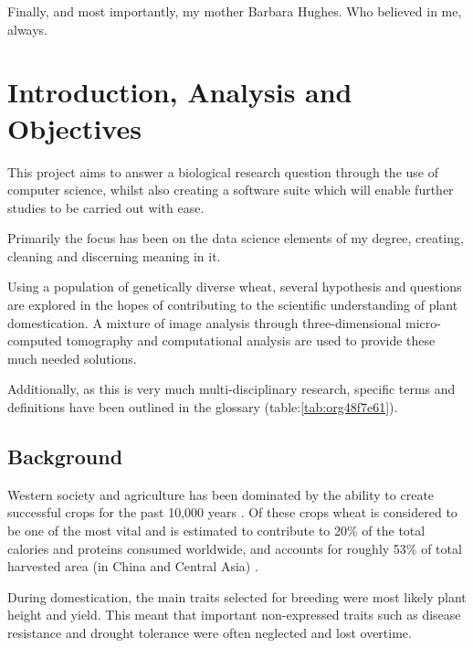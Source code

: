 \documentclass[11pt]{report}
\begin{document}
\vspace{1cm}

Finally, and most importantly, my mother Barbara Hughes. Who believed in me, always.



  \clearpage
  \tableofcontents
  \clearpage
  \listoftables
  \clearpage
  \listoffigures
  \clearpage
  \listofmyequations
  \clearpage
  \listoflistings
  \clearpage

\chapter{Introduction, Analysis and Objectives}
\label{sec:org4b0a4eb}

This project aims to answer a biological research question through the use of computer science, whilst also creating a software suite which will enable further studies to be carried out with ease.

Primarily the focus has been on the data science elements of my degree, creating, cleaning and discerning meaning in it.

Using a population of genetically diverse wheat, several hypothesis and questions are explored in the hopes of contributing to the scientific understanding of plant domestication. A mixture of image analysis through three-dimensional micro-computed tomography and computational analysis are used to provide these much needed solutions.


Additionally, as this is very much multi-disciplinary research, specific terms and definitions have been outlined in the glossary (table:\ref{tab:org48f7e61}).

\section{Background}
\label{sec:org7f2ed58}

Western society and agriculture has been dominated by the ability to create successful crops for the past 10,000 years \cite{Ozkan2002}. Of these crops wheat is considered to be one of the most vital and is estimated to contribute to 20\% of the total calories and proteins consumed worldwide, and accounts for roughly 53\% of total harvested area (in China and Central Asia) \cite{Shiferaw2013}.

During domestication, the main traits selected for breeding were most likely plant height and yield. This meant that important non-expressed traits such as disease resistance and drought tolerance were often neglected and lost overtime.
\end{document}
